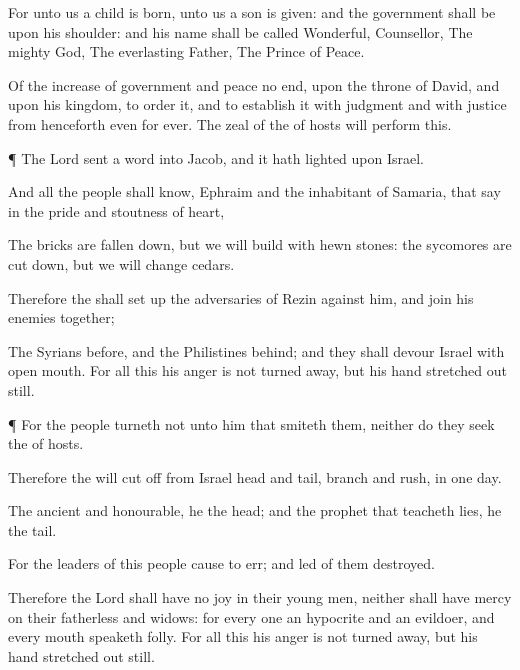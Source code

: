 {For unto us a
child is
born, unto us a
son is
given: and the
government shall be upon his
shoulder: and his
name shall be
called
Wonderful,
Counsellor, The
mighty
God, The
everlasting
Father, The
Prince of
Peace.

Of the
increase of
{}
government and
peace
{} no
end, upon the
throne of
David, and upon his
kingdom, to
order it, and to
establish it with
judgment and with
justice from henceforth even
for
ever. The
zeal of the
{} of
hosts will
perform this.


\par }{\PP {}¶ The
Lord
sent a
word into
Jacob, and it hath
lighted upon
Israel.

And all the
people shall
know,
{}
Ephraim and the
inhabitant of
Samaria, that
say in the
pride and
stoutness of
heart,

The
bricks are fallen
down, but we will
build with hewn
stones: the
sycomores are cut
down, but we will
change
{}
cedars.

Therefore the
{} shall set
up the
adversaries of
Rezin against him, and
join his
enemies
together;

The
Syrians
before, and the
Philistines
behind; and they shall
devour
Israel with open
mouth. For all this his
anger is not turned
away, but his
hand
{} stretched out
still.


\par }{\PP {}¶ For the
people
turneth not unto him that
smiteth them, neither do they
seek the
{} of
hosts.

Therefore the
{} will cut
off from
Israel
head and
tail,
branch and
rush, in
one
day.

The
ancient and
honourable,
he
{} the
head; and the
prophet that
teacheth
lies, he
{} the
tail.

For the
leaders of this
people cause
{} to
err; and
{}
led of them
{}
destroyed.

Therefore the
Lord shall have no
joy in their young
men, neither shall have
mercy on their
fatherless and
widows: for every one
{} an
hypocrite and an
evildoer, and every
mouth
speaketh
folly. For all this his
anger is not turned
away, but his
hand
{} stretched out
still.


}
